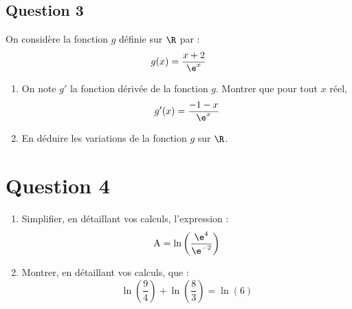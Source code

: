 \subsection*{Question 3}
	On considère la fonction $g$ définie sur $\R$ par :
	\[g(x)=\dfrac{x+2}{\e^{x}}\]

	\begin{enumerate}
		\item On note $g'$ la fonction dérivée de la fonction $g$. Montrer que pour tout $x$ réel,
		\[g'(x)=\dfrac{-1-x}{\e^{x}}\]

		\item En déduire les variations de la fonction $g$ sur $\R$.
	\end{enumerate}

\section*{Question 4}
	\begin{enumerate}
		\item Simplifier, en détaillant vos calculs, l'expression :
		\[\mathrm{A}=\ln \left(\dfrac{\e^{4}}{\e^{-2}}\right)\]

		\item Montrer, en détaillant vos calculs, que :
		\[\ln \left(\dfrac{9}{4}\right)+\ln \left(\dfrac{8}{3}\right)=\ln (6)\]
	\end{enumerate}
